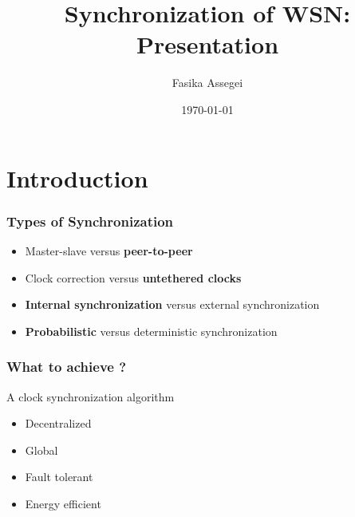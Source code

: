 \documentclass[t]{beamer}
\title{Synchronization of WSN: Presentation}
\author{Fasika Assegei}
\date{\today}
\begin{document}
\begin{frame}
\titlepage
\end{frame}
\frame{\tableofcontents}
\section{Introduction}
\begin{frame}
 \frametitle{Types of Synchronization}
\begin{itemize}
 \item Master-slave versus \textbf{peer-to-peer}\newline
 \item Clock correction versus \textbf{untethered clocks} \newline
 \item \textbf{Internal synchronization} versus external synchronization
 \newline
 \item \textbf{Probabilistic} versus deterministic synchronization \newline
\end{itemize}
\end{frame}
\begin{frame}
\frametitle{What to achieve ?} A clock synchronization
algorithm\newline
\begin{itemize}
\item Decentralized \newline
\item Global \newline
\item Fault tolerant \newline
\item Energy efficient
\end{itemize}
\end{frame}
\end{document}
